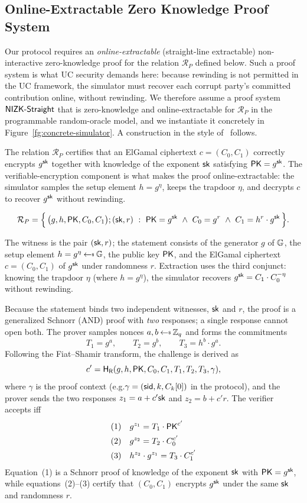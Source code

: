 \subsection{Online-Extractable Zero Knowledge Proof System}
\label{def:online-extractable}
Our protocol requires an \emph{online-extractable} (straight-line extractable)
non-interactive zero-knowledge proof for the relation $\mathcal{R}_P$ defined below.
Such a proof system is what UC security demands here: because rewinding is not
permitted in the UC framework, the simulator must recover each corrupt party's
committed contribution online, without rewinding. We therefore assume a proof
system $\mathsf{NIZK}\hbox{-}{\mathsf{Straight}}$ that is zero-knowledge and online-extractable for
$\mathcal{R}_P$ in the programmable random-oracle model, and we instantiate it
concretely in Figure~\ref{fg:concrete-simulator}. A construction in the style
of~\cite{BCK25} follows.

The relation $\mathcal{R}_P$ certifies that an ElGamal ciphertext $c=(C_0,C_1)$
correctly encrypts $g^{\mathsf{sk}}$ together with knowledge of the exponent $\mathsf{sk}$
satisfying $\mathsf{PK} = g^{\mathsf{sk}}$. The verifiable-encryption component is what makes the proof
online-extractable: the simulator samples the setup element $h = g^{\eta}$, keeps
the trapdoor $\eta$, and decrypts $c$ to recover $g^{\mathsf{sk}}$ without rewinding.

\[
  \mathcal{R}_P = \Big\{\, \big(g, h, \mathsf{PK}, C_0, C_1\big) ; (\mathsf{sk}, r) \ :\
    \mathsf{PK} = g^{\mathsf{sk}} \ \wedge\ C_0 = g^{r} \ \wedge\ C_1 = h^{r}\cdot g^{\mathsf{sk}} \,\Big\}.
\]

The witness is the pair $(\mathsf{sk}, r)$; the statement consists of the generator $g$ of $\mathbb{G}$, the setup element
$h = g^{\eta} \rgets \Gr$, the public key $\mathsf{PK}$, and the ElGamal ciphertext $c = (C_0, C_1)$ of $g^{\mathsf{sk}}$ under
randomness $r$. Extraction uses the third conjunct: knowing the trapdoor $\eta$ (where $h = g^{\eta}$), the
simulator recovers $g^{\mathsf{sk}} = C_1 \cdot C_0^{-\eta}$ without rewinding.

Because the statement binds two independent witnesses, $\mathsf{sk}$ and $r$, the proof is a generalized Schnorr
(AND) proof with \emph{two} responses; a single response cannot open both. The prover samples nonces
$a, b \rgets \Zq$ and forms the commitments
\[
  T_1 = g^{a}, \qquad T_2 = g^{b}, \qquad T_3 = h^{b}\cdot g^{a}.
\]
Following the Fiat--Shamir transform, the challenge is derived as
\[
  c' = \mathsf{H_{\mathsf{R}}}(g, h, \mathsf{PK}, C_0, C_1, T_1, T_2, T_3, \gamma),
\]
where $\gamma$ is the proof context (e.g.\@ $\gamma = (\mathsf{sid}, k, C_k[0])$ in the protocol), and the prover
sends the two responses $z_1 = a + c'\mathsf{sk}$ and $z_2 = b + c' r$. The verifier accepts iff
\begin{align*}
  (1)\quad & g^{z_1} = T_1 \cdot \mathsf{PK}^{c'} \\
  (2)\quad & g^{z_2} = T_2 \cdot C_0^{c'} \\
  (3)\quad & h^{z_2}\cdot g^{z_1} = T_3 \cdot C_1^{c'}
\end{align*}
Equation~(1) is a Schnorr proof of knowledge of the exponent $\mathsf{sk}$ with $\mathsf{PK} = g^{\mathsf{sk}}$, while equations~(2)--(3) certify that
$(C_0, C_1)$ encrypts $g^{\mathsf{sk}}$ under the same $\mathsf{sk}$ and randomness $r$.

